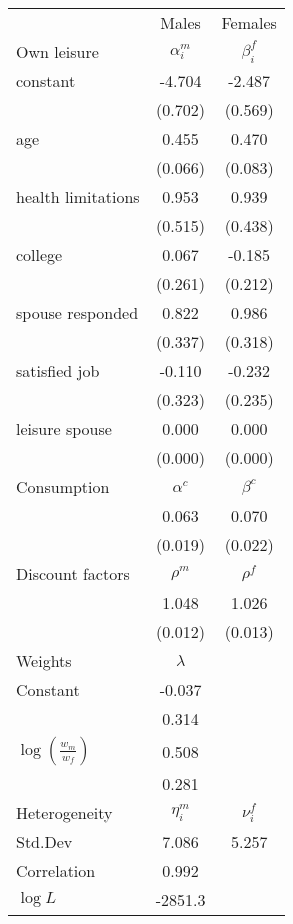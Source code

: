 \begin{tabular}{lcc} 
\hline\hline 
 & Males & Females \\ 
Own leisure & $\alpha_{i}^{m}$ & $\beta_{i}^{f}$ \\ 
constant & -4.704 & -2.487 \\ 
 & (0.702) & (0.569) \\ 
age & 0.455 & 0.470 \\ 
 & (0.066) & (0.083) \\ 
health limitations & 0.953 & 0.939 \\ 
 & (0.515) & (0.438) \\ 
college & 0.067 & -0.185 \\ 
 & (0.261) & (0.212) \\ 
spouse responded & 0.822 & 0.986 \\ 
 & (0.337) & (0.318) \\ 
satisfied job & -0.110 & -0.232 \\ 
 & (0.323) & (0.235) \\ 
leisure spouse & 0.000 & 0.000 \\ 
 & (0.000) & (0.000) \\ 
Consumption & $\alpha^{c}$ & $\beta^{c}$ \\ 
 & 0.063 & 0.070 \\ 
 & (0.019) & (0.022) \\ 
Discount factors & $\rho^m$ & $\rho^f$ \\ 
 & 1.048 & 1.026 \\ 
 & (0.012) & (0.013) \\ 
Weights & $\lambda$ &  \\ 
Constant & -0.037 &  \\ 
 & 0.314 &  \\ 
$\log(\frac{w_m}{w_f})$ & 0.508 &  \\ 
 & 0.281 &  \\ 
Heterogeneity & $\eta_i^m$ & $\nu_i^f$ \\ 
Std.Dev & 7.086 & 5.257 \\ 
Correlation & 0.992 &  \\ 
\hline 
$\log L$ & -2851.3 & \\ 
\hline \hline 
\end{tabular} 

